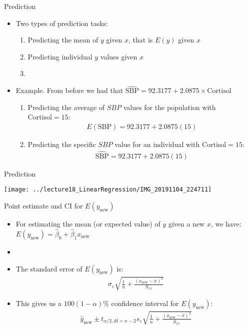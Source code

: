 \documentclass[xcolor=dvipsnames]{beamer}
\begin{document}
\begin{frame}{Prediction}
	\begin{itemize}
		\item Two types of prediction tasks: \pause
		\begin{enumerate}
			\item Predicting the mean of $y$ given $x$, that is $E(y)$ given $x$ \pause
			\item Predicting individual $y$ values given $x$ \pause
			\item[]
		\end{enumerate}
		\item Example. From before we had that $\hat{\text{SBP}} = 92.3177 + 2.0875 \times \text{Cortisol}$ \pause
		\begin{enumerate}
			\item Predicting the average of $SBP$ values for the population with $\text{Cortisol} = 15$: \pause
			\begin{gather*}
				E(\text{SBP}) = 92.3177 + 2.0875(15)
			\end{gather*} \pause
			\item Predicting the specific $SBP$ value for an individual with $\text{Cortisol} = 15$: \pause
			\begin{gather*}
				\hat{\text{SBP}} = 92.3177 + 2.0875(15)
			\end{gather*}
		\end{enumerate}
	\end{itemize}
\end{frame}

\begin{frame}{Prediction}
	\begin{center}
		\texttt{[image: ../lecture18\_LinearRegression/IMG\_20191104\_224711]}
	\end{center}
\end{frame}

\begin{frame}{Point estimate and CI for $E(y_{\text{new}})$}
	\begin{itemize}
		\item For estimating the mean (or expected value) of $y$ given a new $x$, we have: $E(y_{\text{new}}) = \hat{\beta}_0 + \hat{\beta}_1 x_{\text{new}}$ \pause
		\item[]
		\item The standard error of $E(y_{\text{new}})$ is: \pause
		\begin{gather*}
			\sigma_{\varepsilon} \sqrt{\frac{1}{n} + \frac{(x_{\text{new}}-\bar{x})^2}{S_{xx}}}
		\end{gather*} \pause
		\item This gives us a $100(1-\alpha)\%$ confidence interval for $E(y_{\text{new}})$: \pause
		\begin{gather*}
		\hat{y}_{\text{new}} \pm t_{\alpha / 2, \text{df} = n-2}s_{\varepsilon}\sqrt{\frac{1}{n} + \frac{(x_{\text{new}}-\bar{x})^2}{S_{xx}}}
		\end{gather*}
	\end{itemize}
\end{frame}
\end{document}
